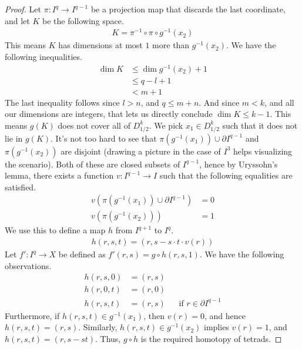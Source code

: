 \begin{proof}
    Let $\pi: I^q \to I^{q-1}$ be a projection map that discards the last coordinate, and let $K$ be
    the following space.
    \begin{align*}
      K = \pi^{-1} \circ \pi \circ g^{-1} (x_2)
    \end{align*}
    This means $K$ has dimensions at most $1$ more than $g^{-1}(x_2)$. We have the following
    inequalities.
    \begin{align*}
      \dim K &\leq \dim g^{-1}(x_2) + 1 \\
             &\leq q - l + 1 \\
             &< m + 1
    \end{align*}
    The last inequality follows since $l > n$, and $q \leq m+n$. And since $m < k$, and all our
    dimensions are integers, that lets us directly conclude $\dim K \leq k - 1$. This means $g(K)$
    does not cover all of $D^k_{1/2}$. We pick $x_1 \in D^k_{1/2}$ such that it does not lie in
    $g(K)$. It's not too hard to see that $\pi(g^{-1}(x_1)) \cup \partial I^{q-1}$ and
    $\pi(g^{-1}(x_2))$ are disjoint (drawing a picture in the case of $I^3$ helps visualizing the
    scenario). Both of these are closed subsets of
    $I^{q-1}$, hence by Uryssohn's lemma, there exists a function $v: I^{q-1} \to I$ such that the
    following equalities are satisfied.
    \begin{align*}
      v(\pi(g^{-1}(x_1)) \cup \partial I^{q-1}) &= 0 \\
      v(\pi(g^{-1}(x_2))) &= 1
    \end{align*}
    We use this to define a map $h$ from $I^{q+1}$ to $I^q$.
    \begin{align*}
      h(r, s, t) = (r, s - s \cdot t \cdot v(r))
    \end{align*}
    Let $f': I^q \to X$ be defined as $f'(r,s) = g \circ h(r,s, 1)$.  We have the following
    observations.
    \begin{align*}
      h(r,s,0) &= (r,s) \\
      h(r,0,t) &= (r, 0) \\
      h(r,s,t) &= (r,s) &&\text{if $r \in \partial I^{q-1}$}
    \end{align*}
    Furthermore, if $h(r,s,t) \in g^{-1}(x_1)$, then $v(r) = 0$, and hence $h(r,s,t) = (r,s)$.
    Similarly, $h(r,s,t) \in g^{-1}(x_2)$ implies $v(r)= 1$, and $h(r,s,t) = (r, s-st)$. Thus,
    $g \circ h$ is the required homotopy of tetrads.
    
  \end{proof}
  
